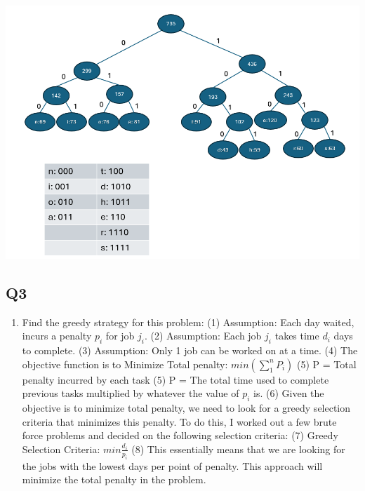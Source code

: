 \documentclass{article}
\begin{document}
\begin{enumerate}[label=(\alph*)]
    \subitem \includegraphics[width=1\textwidth]{huffman4.png}
\end{enumerate}

\subsection*{Q3}
\begin{enumerate}[label=(\alph*)]
    \item Find the greedy strategy for this problem:
    \subitem (1) Assumption: Each day waited, incurs a penalty $p_i$ for job $j_i$.
    \subitem (2) Assumption: Each job $j_i$ takes time $d_i$ days to complete.
    \subitem (3) Assumption: Only 1 job can be worked on at a time.
    \subitem (4) The objective function is to Minimize Total penalty: $min(\sum_{1}^{n} P_i)$
    \subitem (5) P = Total penalty incurred by each task
    \subitem (5) P = The total time used to complete previous tasks multiplied by whatever the value of $p_i$ is.
    \subitem (6) Given the objective is to minimize total penalty, we need to look for a greedy selection criteria that minimizes this penalty. To do this, I worked out a few brute force problems and decided on the following selection criteria:
    \subitem (7) Greedy Selection Criteria: $min\frac{d_i}{p_i}$
    \subitem (8) This essentially means that we are looking for the jobs with the lowest days per point of penalty. This approach will minimize the total penalty in the problem.
    
\end{enumerate}

\end{document}
